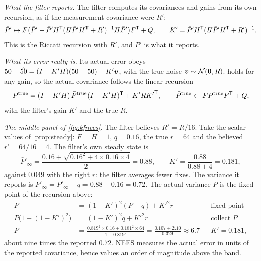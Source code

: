  \emph{What the filter reports.} The filter computes its
covariances and gains from its own recursion, as if the measurement
covariance were $R'$:
\[
  \bar P'\mapsto F\bigl(\bar P'-\bar P'H^{\mathsf{T}}(H\bar P'H^{\mathsf{T}}+R')^{-1}H\bar
  P'\bigr)F^{\mathsf{T}}+Q,\qquad K'=\bar P'H^{\mathsf{T}}(H\bar P'H^{\mathsf{T}}+R')^{-1}.
\]
This is the Riccati recursion with $R'$, and $\bar P'$ is what it
reports.

\emph{What its error really is.} Its actual error obeys
$50-\hat{50}=(I-K'H)(50-\bar{50})-K'\bm{v}$, with the true noise
$\bm{v}\sim\mathcal{N}(\bm{0},R)$.  holds for any gain, so the
actual covariance follows the linear recursion
\[
  P^{\mathrm{true}}=(I-K'H)\,\bar P^{\mathrm{true}}(I-K'H)^{\mathsf{T}}+K'R{K'}^{\mathsf{T}},
  \qquad\bar P^{\mathrm{true}}\leftarrow FP^{\mathrm{true}}F^{\mathsf{T}}+Q ,
\]
with the filter's gain $K'$ and the true $R$.

\emph{The middle panel of \cref{fig:kfnees}.} The filter believes
$R'=R/16$. Take the scalar values of \cref{prop:steady}: $F=H=1$,
$q=0.16$, the true $r=64$ and the believed $r'=64/16=4$. The filter's own
steady state is
\[
  \bar P'_\infty=\frac{0.16+\sqrt{0.16^2+4\times0.16\times4}}{2}=0.88,
  \qquad K'=\frac{0.88}{0.88+4}=0.181,
\]
against $0.049$ with the right $r$: the filter averages fewer fixes. The
variance it reports is $P'_\infty=\bar P'_\infty-q=0.88-0.16=0.72$. The
actual variance $P$ is the fixed point of the recursion above:
\begin{align*}
  P&=(1-K')^2(P+q)+K'^2r
  &&\text{fixed point}\\
  P\bigl(1-(1-K')^2\bigr)&=(1-K')^2q+K'^2r
  &&\text{collect }P\\
  P&=\frac{0.819^2\times0.16+0.181^2\times64}{1-0.819^2}
  =\frac{0.107+2.10}{0.329}\approx6.7
  &&K'=0.181,
\end{align*}
about nine times the reported $0.72$. NEES measures the actual error in
units of the reported covariance, hence values an order of magnitude
above the band.
